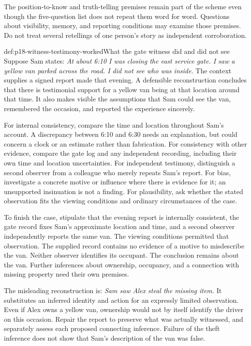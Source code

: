 The position-to-know and truth-telling premises remain part of the
scheme even though the five-question list does not repeat them word
for word. Questions about visibility, memory, and reporting conditions
may examine those premises. Do not treat several retellings of one
person's story as independent corroboration.

\begin{hbexample}{def:p18-witness-testimony-worked}{What the gate witness did and did not see}
Suppose Sam states:
\emph{At about 6:10 I was closing the east service gate. I saw a yellow
van parked across the road. I did not see who was inside.}
The context supplies a signed report made that evening.
A defensible reconstruction concludes that there is testimonial support
for a yellow van being at that location around that time.
It also makes visible the assumptions that Sam could see the van,
remembered the occasion, and reported the experience sincerely.

For internal consistency, compare the time and location throughout
Sam's account. A discrepancy between 6:10 and 6:30 needs an explanation,
but could concern a clock or an estimate rather than fabrication.
For consistency with other evidence, compare the gate log and any
independent recording, including their own time and location uncertainties.
For independent testimony, distinguish a second observer from a colleague
who merely repeats Sam's report. For bias, investigate a concrete motive
or influence where there is evidence for it; an unsupported insinuation
is not a finding. For plausibility, ask whether the stated observation
fits the viewing conditions and ordinary circumstances of the case.

To finish the case, stipulate that the evening report is internally
consistent, the gate record fixes Sam's approximate location and time,
and a second observer independently reports the same van.
The viewing conditions permitted that observation. The supplied record
contains no evidence of a motive to misdescribe the van.
Neither observer identifies its occupant. The conclusion
remains about the van. Further inferences about ownership, occupancy,
and a connection with missing property need their own premises.

The misleading reconstruction is:
\emph{Sam saw Alex steal the missing item.}
It substitutes an inferred identity and action for an expressly limited
observation. Even if Alex owns a yellow van, ownership would not by itself
identify the driver on this occasion. Repair the report to preserve what
was actually witnessed, and separately assess each proposed connecting
inference. Failure of the theft inference does not show that Sam's
description of the van was false.
\end{hbexample}

